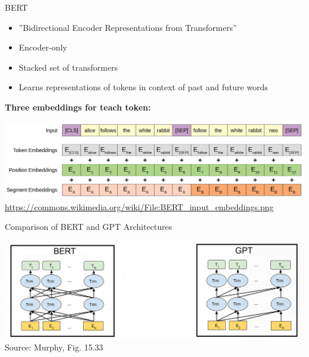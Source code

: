 \documentclass[ignorenonframetext,xcolor=x11names]{beamer}
\begin{document}
\begin{frame}{BERT}
\begin{itemize}
\item  ''Bidirectional Encoder Representations from Transformers''
\item Encoder-only
\item Stacked set of transformers
\item Learns representations of tokens in context of past and future words
\end{itemize}

\textbf{Three embeddings for teach token:}
\begin{center}
\includegraphics[width=\textwidth]{BERT_input_embeddings.png} \\

\scriptsize \url{https://commons.wikimedia.org/wiki/File:BERT_input_embeddings.png} \normalsize
\end{center}
\end{frame}

\begin{frame}{Comparison of BERT and GPT Architectures}
\centering

\includegraphics[width=\textwidth]{murphy_15_33.png} \\

\scriptsize Source: Murphy, Fig. 15.33 \normalsize
\end{frame}
\end{document}
